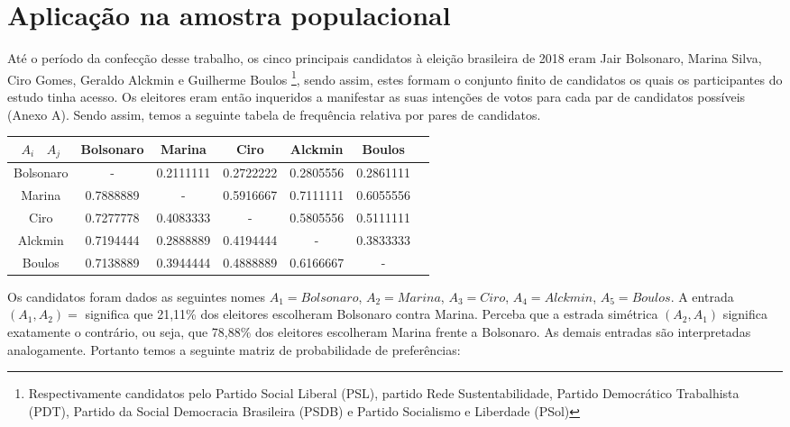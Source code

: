 \documentclass[
	article,			%
	12pt,				%
	oneside,			%
	a4paper,			%
	english,			%
	brazil,				%
	]{abntex2}
\begin{document}
\section{Aplicação na amostra populacional}


Até o período da confecção desse trabalho, os cinco principais candidatos à eleição brasileira de 2018 eram Jair Bolsonaro, Marina Silva, Ciro Gomes, Geraldo Alckmin e Guilherme Boulos \footnote{Respectivamente candidatos pelo Partido Social Liberal (PSL), partido Rede Sustentabilidade, Partido Democrático Trabalhista (PDT), Partido da Social Democracia Brasileira (PSDB) e Partido Socialismo e Liberdade (PSol)}, sendo assim, estes formam o conjunto finito de candidatos os quais os participantes do estudo tinha acesso. Os eleitores eram então inqueridos a manifestar as suas intenções de votos para cada par de candidatos possíveis (Anexo A). Sendo assim, temos a seguinte tabela de frequência relativa por pares de candidatos.

\begin{center}
\begin{tabular}{ c | c c c c c c| } 
\hline
 $A_\textit{i}$ \ $A_\textit{j}$ & Bolsonaro & Marina & Ciro & Alckmin & Boulos\\ 
\hline
Bolsonaro & - & 0.2111111 & 0.2722222 & 0.2805556 & 0.2861111\\
Marina & 0.7888889 & - & 0.5916667 & 0.7111111 & 0.6055556\\
Ciro & 0.7277778 & 0.4083333 & - & 0.5805556 & 0.5111111\\
Alckmin & 0.7194444 & 0.2888889 & 0.4194444 & - & 0.3833333\\
Boulos & 0.7138889 & 0.3944444 & 0.4888889 & 0.6166667 & -\\
\hline
\end{tabular}
\end{center}

Os candidatos foram dados as seguintes nomes $A_\textit{1} = Bolsonaro$, $A_\textit{2} = Marina$, $A_\textit{3} = Ciro$, $A_\textit{4} = Alckmin$, $A_\textit{5} = Boulos$. A entrada $(A_\textit{1}, A_\textit{2}) = $ significa que 21,11\% dos eleitores escolheram Bolsonaro contra Marina. Perceba que a estrada simétrica $(A_\textit{2}, A_\textit{1})$ significa exatamente o contrário, ou seja, que 78,88\% dos eleitores escolheram Marina frente a Bolsonaro. As demais entradas são interpretadas analogamente. Portanto temos a seguinte matriz de probabilidade de preferências:
\end{document}
